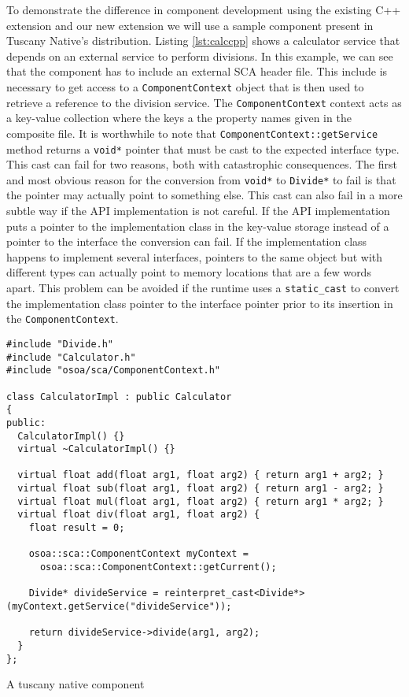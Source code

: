To demonstrate the difference in component development using the existing C++ extension and our
new extension we will use a sample component present in Tuscany Native's distribution. Listing
\ref{lst:calccpp} shows a calculator service that depends on an external service to perform
divisions. In this example, we can see that the component has to include an external SCA header
file. This include is necessary to get access to a \texttt{ComponentContext} object that is then
used to retrieve a reference to the division service. The \texttt{ComponentContext} context acts
as a key-value collection where the keys a the property names given in the composite file.
It is worthwhile to note that \texttt{ComponentContext::getService} method returns a \texttt{void*}
pointer that must be cast to the expected interface type. This cast can fail for two reasons, both
with catastrophic consequences. The first and most obvious reason for the conversion from \texttt{void*} to
\texttt{Divide*} to fail is that the pointer may actually point to something else.
This cast can also fail in a more subtle way if the API implementation is not careful. If the
API implementation puts a pointer to the implementation class in the key-value storage instead of
a pointer to the interface the conversion can fail. If the implementation class happens to
implement several interfaces, pointers to the same object but with different types can actually
point to memory locations that are a few words apart. This problem can be avoided if the runtime
uses a \texttt{static\_cast} to convert the implementation class pointer to the interface pointer
prior to its insertion in the \texttt{ComponentContext}.

\begin{listing}
\begin{verbatim}
#include "Divide.h"
#include "Calculator.h"
#include "osoa/sca/ComponentContext.h"

class CalculatorImpl : public Calculator
{
public:
  CalculatorImpl() {}
  virtual ~CalculatorImpl() {}

  virtual float add(float arg1, float arg2) { return arg1 + arg2; }
  virtual float sub(float arg1, float arg2) { return arg1 - arg2; }
  virtual float mul(float arg1, float arg2) { return arg1 * arg2; }
  virtual float div(float arg1, float arg2) {
    float result = 0;

    osoa::sca::ComponentContext myContext = 
      osoa::sca::ComponentContext::getCurrent();

    Divide* divideService = reinterpret_cast<Divide*>(myContext.getService("divideService"));

    return divideService->divide(arg1, arg2);
  }
};
\end{verbatim}
\caption{A tuscany native component}
\label{lst:calccpp}
\end{listing}

